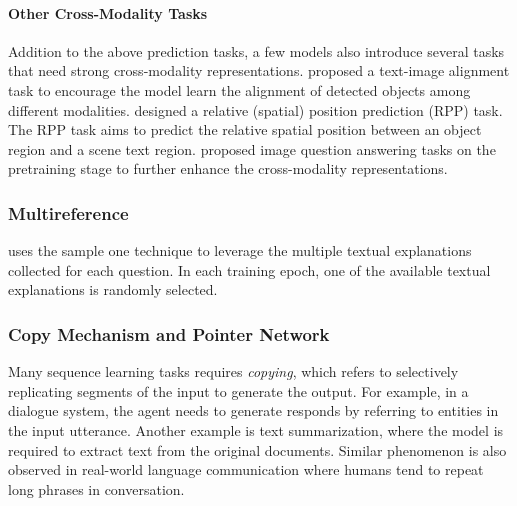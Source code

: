 \documentclass[11pt,a4paper]{article}
\begin{document}
\paragraph{Other Cross-Modality Tasks}  Addition to the above prediction tasks, a few models also introduce several tasks that need strong cross-modality representations. \citet{xu2021layoutlmv2} proposed a text-image alignment task to encourage the model learn the alignment of detected objects among different modalities. \citet{yang2021tap} designed a relative (spatial) position prediction (RPP) task. The RPP task aims to predict the relative spatial position between an object region and a scene text region. \citet{tan2019lxmert} proposed image question answering tasks on the pretraining stage to further enhance the cross-modality representations.



\subsubsection{Multireference}
\citet{rao2021first} uses the sample one technique to leverage the multiple textual explanations collected for each question. In each training epoch, one of the available textual explanations is randomly selected.

\subsubsection{Copy Mechanism and Pointer Network}

Many sequence learning tasks requires \textit{copying}, which refers to selectively replicating segments of the input to generate the output. For example, in a dialogue system, the agent needs to generate responds by referring to entities in the input utterance. Another example is text summarization, where the model is required to extract text from the original documents. Similar phenomenon is also observed in real-world language communication where humans tend to repeat long phrases in conversation.
\end{document}
